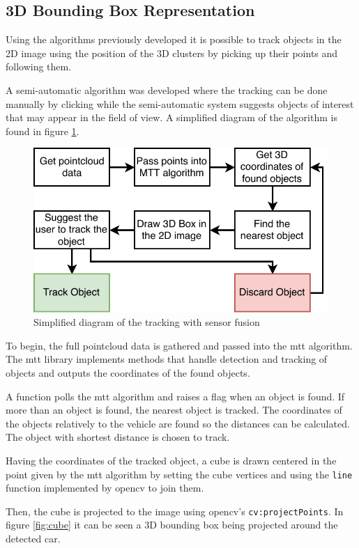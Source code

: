 \subsection{3D Bounding Box Representation}

Using the algorithms previously developed it is possible to track objects in the 2D image using the position of the 3D clusters by picking up their points and following them.

A semi-automatic algorithm was developed where the tracking can be done manually by clicking while the semi-automatic system suggests objects of interest that may appear in the field of view. A simplified diagram of the algorithm is found in figure \ref{fig:bbdiagram}.

\begin{figure}[htp]
	
	\centering
	\includegraphics[width=.6\textwidth]{caplabel/imgs/bbdiagram.pdf}
	
	\caption{Simplified diagram of the tracking with sensor fusion}
	\label{fig:bbdiagram}
	
\end{figure}

To begin, the full pointcloud data is gathered and passed into the \gls{mtt} algorithm. The \gls{mtt} library implements methods that handle detection and tracking of objects and outputs the coordinates of the found objects. 

A function polls the \gls{mtt} algorithm and raises a flag when an object is found. If more than an object is found, the nearest object is tracked. The coordinates of the objects relatively to the vehicle are found so the distances can be calculated. The object with shortest distance is chosen to track.

Having the coordinates of the tracked object, a cube is drawn centered in the point given by the \gls{mtt} algorithm by setting the cube vertices and using the \texttt{line} function implemented by \gls{opencv} to join them.

Then, the cube is projected to the image using \gls{opencv}'s \texttt{cv:projectPoints}. In figure \ref{fig:cube} it can be seen a 3D bounding box being projected around the detected car.

